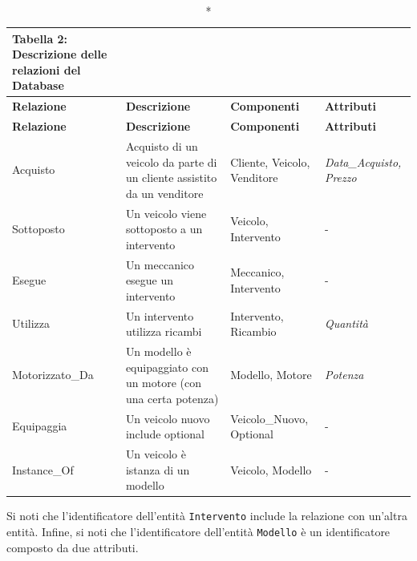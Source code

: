 \vspace{1cm}

\begin{longtable}{|p{3cm}|p{5cm}|>{\RaggedRight\arraybackslash}p{3.5cm}|p{3cm}|}

\caption*{\textbf{Tabella 2:} Descrizione delle relazioni del Database}
\\

\hline
\textbf{Relazione} & \textbf{Descrizione} & \textbf{Componenti} & \textbf{Attributi} \\
\hline
\endfirsthead

\hline
\textbf{Relazione} & \textbf{Descrizione} & \textbf{Componenti} & \textbf{Attributi} \\
\hline
\endhead

Acquisto &
Acquisto di un veicolo da parte di un cliente assistito da un venditore &
Cliente, Veicolo, Venditore &
\textit{Data\_Acquisto, Prezzo} \\
\hline

Sottoposto &
Un veicolo viene sottoposto a un intervento &
Veicolo, Intervento &
- \\
\hline

Esegue &
Un meccanico esegue un intervento &
Meccanico, Intervento &
- \\
\hline

Utilizza &
Un intervento utilizza ricambi &
Intervento, Ricambio &
\textit{Quantità} \\
\hline

Motorizzato\_Da &
Un modello è equipaggiato con un motore (con una certa potenza) &
Modello, Motore &
\textit{Potenza} \\
\hline

Equipaggia &
Un veicolo nuovo include optional &
Veicolo\_Nuovo, Optional &
- \\
\hline

Instance\_Of &
Un veicolo è istanza di un modello &
Veicolo, Modello &
- \\
\hline

\end{longtable}



\vspace{0.5cm}

Si noti che l'identificatore dell'entità \texttt{Intervento} include la relazione con un'altra entità.\newline
Infine, si noti che l'identificatore dell'entità \texttt{Modello} è un identificatore composto da due attributi.